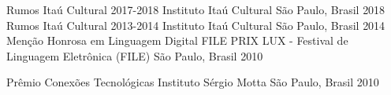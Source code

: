 


\begin{cvhonors}
 \cvhonor
    {Rumos Itaú Cultural 2017-2018} %
    {Instituto Itaú Cultural} %
    {São Paulo, Brasil} %
    {2018} %
 \cvhonor
    {Rumos Itaú Cultural 2013-2014} %
    {Instituto Itaú Cultural} %
    {São Paulo, Brasil} %
    {2014} %
  \cvhonor
    {Menção Honrosa em Linguagem Digital} %
    {FILE PRIX LUX - Festival de Linguagem Eletrônica (FILE)} %
    {São Paulo, Brasil} %
    {2010} %

  \cvhonor
    {Prêmio Conexões Tecnológicas} %
    {Instituto Sérgio Motta} %
    {São Paulo, Brasil} %
    {2010} %
\end{cvhonors}
